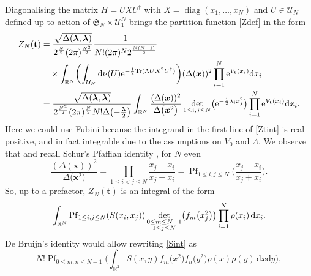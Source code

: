 \documentclass[pdftex]{sigma}
\numberwithin{equation}{section}
\newcommand{\dd}{\mathrm{d}}
\begin{document}
Diagonalising the matrix $H = UXU^{\dagger}$ with $X = \operatorname{diag}(x_1,\dots,x_N)$ and $U \in \mathcal{U}_N$ defined up to action of $\mathfrak{S}_N \times \mathcal{U}_1^{N}$ brings the partition function \eqref{Zdef} in the form
\begin{align}
Z_N(\mathbf{t}) & = \frac{\sqrt{\Delta(\boldsymbol{\lambda},\boldsymbol{\lambda})}}{2^{\frac{N}{2}} (2\pi)^{\frac{N^2}{2}}} \frac{1}{N! (2\pi)^N 2^{\frac{N(N - 1)}{2}}} \nonumber\\
&\quad{}\times \int_{\mathbb{R}^N} \biggl(\int_{\mathcal{U}_N} \dd \nu(U) {\rm e}^{-\frac{1}{2}{\rm Tr}(\Lambda U X^2 U^{\dagger})}\biggr) (\Delta(\boldsymbol{x}))^2 \prod_{i = 1}^N {\rm e}^{V_{\mathbf{t}}(x_i)}\dd x_i \nonumber \\
& = \frac{\sqrt{\Delta(\boldsymbol{\lambda},\boldsymbol{\lambda})}}{2^{\frac{N^2}{2}} (2\pi)^{\frac{N}{2}} N! \Delta\bigl(-\frac{\boldsymbol{\lambda}}{2}\bigr)} \int_{\mathbb{R}^N} \frac{(\Delta(\boldsymbol{x}))^2}{\Delta\bigl(\boldsymbol{x}^2\bigr)} \mathop{\det}_{1 \leq i,j \leq N} \bigl({\rm e}^{-\frac{1}{2}\lambda_ix_j^2}\bigr) \prod_{i = 1}^N {\rm e}^{V_{\mathbf{t}}(x_i)} \dd x_i. \label{Ztint}
\end{align}
Here we could use Fubini because the integrand in the first line of \eqref{Ztint} is real positive, and in fact integrable due to the assumptions on $V_0$ and $\Lambda$. We observe that  and recall Schur's Pfaffian identity \cite{Schur1911}, for $N$ even
\[
\frac{(\Delta(\boldsymbol{x}))^2}{\Delta\bigl(\boldsymbol{x}^2\bigr)} = \prod_{1 \leq i < j \leq N} \frac{x_j - x_i}{x_j + x_i} = \operatorname{Pf}_{1 \leq i,j \leq N}\biggl(\frac{x_j - x_i}{x_j + x_i}\biggr).
\]
So, up to a prefactor, $Z_N(\mathbf{t})$ is an integral of the form
\begin{equation}
\label{Sint}
\int_{\mathbb{R}^N} \operatorname{Pf}_{1 \leq i,j \leq N} (S(x_i,x_j)) \mathop{{\rm det}}_{\substack{0 \leq m \leq N - 1 \\ 1 \leq j \leq N}} \bigl(f_m\bigl(x_j^2\bigr)\bigr) \prod_{i = 1}^N \rho(x_i)\,\dd x_i.
\end{equation}
De Bruijn's identity \cite{deBruijn1955} would allow rewriting \eqref{Sint} as
\begin{equation}
\label{dJ}
N! \operatorname{Pf}_{0 \leq m,n \leq N - 1}\biggl(\int_{\mathbb{R}^2} S(x,y) f_m\bigl(x^2\bigr)f_n\bigl(y^2\bigr)\rho(x)\rho(y)\,\dd x \dd y\biggr),
\end{equation}
\end{document}
